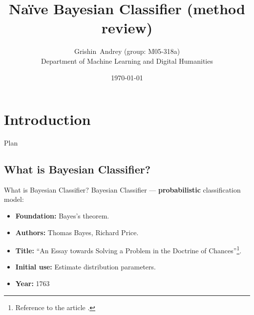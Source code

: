\documentclass[11pt, aspectratio=169]{beamer}
\title{Na\"{i}ve Bayesian Classifier (method review)}
\author[Grishin A.Y.]{{\large Grishin~Andrey} ({\small group: M05-318a})\\\vspace{15pt}Department of Machine Learning and Digital Humanities\\\vspace{15pt}}
\institute[MIPT]{\LARGE Moscow Institute of Physics and Technology}
\date{\today}
\newcommand{\emphtext}[1]{\color{black} \textbf{#1}}
\begin{document}
    
    \section{Introduction} 
    \begin{frame}
        \titlepage
    \end{frame}
    
    \begin{frame}{Plan}
    	\tableofcontents
    \end{frame}
      
    \subsection{What is Bayesian Classifier?}
    \begin{frame}{What is Bayesian Classifier?}
    	\large
    	\noindent Bayesian Classifier --- \textbf{probabilistic} classification model:\\[10pt]
    	\begin{itemize}
    		\item \emphtext{Foundation:} Bayes's theorem.\\[6pt]
    		\item \emphtext{Authors:} Thomas Bayes, Richard Price.\\[6pt]
    		\item \emphtext{Title:} ``An Essay towards Solving a Problem in the Doctrine of Chances''\footnote{Reference to the article \cite{bayes1763chances}.}.\\[6pt]
    		\item \emphtext{Initial use:} Estimate distribution parameters.\\[6pt]
    		\item \emphtext{Year:} 1763
    	\end{itemize}
    \end{frame}
    
\end{document}
